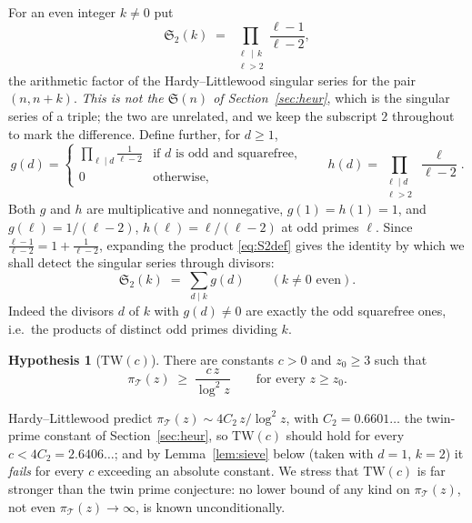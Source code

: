 \documentclass[10pt]{article}
\theoremstyle{definition}
\newtheorem{hypothesis}{Hypothesis}
\theoremstyle{remark}
\newcommand{\T}{\mathcal{T}}
\begin{document}
For an even integer $k \ne 0$ put
\begin{equation}\label{eq:S2def}
  \mathfrak{S}_2(k) \;=\; \prod_{\substack{\ell \,\mid\, k \\ \ell > 2}}
      \frac{\ell - 1}{\ell - 2},
\end{equation}
the arithmetic factor of the Hardy--Littlewood singular series for the pair
$(n, n+k)$. \emph{This is not the $\mathfrak{S}(n)$ of
Section~\ref{sec:heur}}, which is the singular series of a triple; the two are
unrelated, and we keep the subscript $2$ throughout to mark the difference.
Define further, for $d \ge 1$,
\begin{equation}\label{eq:ghdef}
  g(d) =
  \begin{cases}
    \displaystyle\prod_{\ell \mid d} \frac{1}{\ell - 2}
      & \text{if $d$ is odd and squarefree,}\\[2ex]
    0 & \text{otherwise,}
  \end{cases}
  \qquad
  h(d) = \prod_{\substack{\ell \mid d \\ \ell > 2}} \frac{\ell}{\ell - 2}.
\end{equation}
Both $g$ and $h$ are multiplicative and nonnegative, $g(1) = h(1) = 1$, and
$g(\ell) = 1/(\ell-2)$, $h(\ell) = \ell/(\ell-2)$ at odd primes $\ell$. Since
$\frac{\ell-1}{\ell-2} = 1 + \frac{1}{\ell-2}$, expanding the product
\eqref{eq:S2def} gives the identity by which we shall detect the singular
series through divisors:
\begin{equation}\label{eq:divisorexpansion}
  \mathfrak{S}_2(k) \;=\; \sum_{d \mid k} g(d)
  \qquad (k \ne 0 \text{ even}).
\end{equation}
Indeed the divisors $d$ of $k$ with $g(d) \ne 0$ are exactly the odd
squarefree ones, i.e.\ the products of distinct odd primes dividing $k$.

\begin{hypothesis}[$\mathrm{TW}(c)$]\label{hyp:TW}
There are constants $c > 0$ and $z_0 \ge 3$ such that
\[
  \pi_\T(z) \;\ge\; \frac{c\,z}{\log^2 z}
  \qquad\text{for every } z \ge z_0 .
\]
\end{hypothesis}

Hardy--Littlewood \cite{HL} predict $\pi_\T(z) \sim 4C_2\,z/\log^2 z$, with
$C_2 = 0.6601\ldots$ the twin-prime constant of Section~\ref{sec:heur}, so
$\mathrm{TW}(c)$ should hold for every $c < 4C_2 = 2.6406\ldots$; and by
Lemma~\ref{lem:sieve} below (taken with $d = 1$, $k = 2$) it \emph{fails} for
every $c$ exceeding an absolute constant. We stress that $\mathrm{TW}(c)$ is
far stronger than the twin prime conjecture: no lower bound of any kind on
$\pi_\T(z)$, not even $\pi_\T(z) \to \infty$, is known unconditionally.
\end{document}
